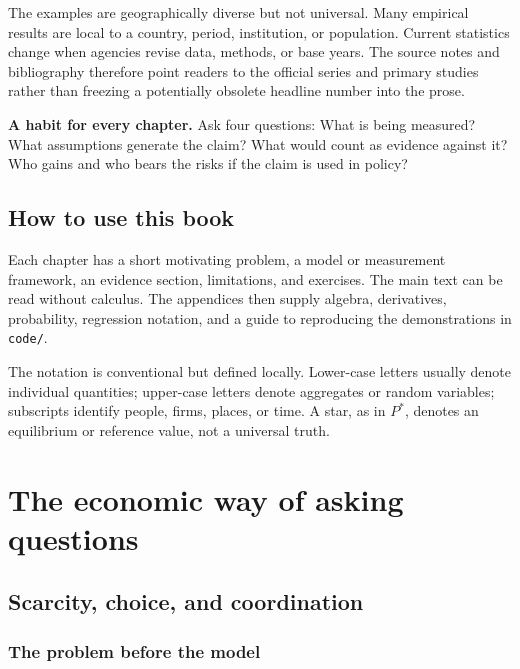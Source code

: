 \documentclass[11pt,oneside,openany]{book}
\begin{document}
The examples are geographically diverse but not universal. Many empirical results are local to a country, period, institution, or population. Current statistics change when agencies revise data, methods, or base years. The source notes and bibliography therefore point readers to the official series and primary studies rather than freezing a potentially obsolete headline number into the prose.

\begin{keybox}
\textbf{A habit for every chapter.} Ask four questions: What is being measured? What assumptions generate the claim? What would count as evidence against it? Who gains and who bears the risks if the claim is used in policy?
\end{keybox}

\chapter*{How to use this book}

Each chapter has a short motivating problem, a model or measurement framework, an evidence section, limitations, and exercises. The main text can be read without calculus. The appendices then supply algebra, derivatives, probability, regression notation, and a guide to reproducing the demonstrations in \texttt{code/}.

The notation is conventional but defined locally. Lower-case letters usually denote individual quantities; upper-case letters denote aggregates or random variables; subscripts identify people, firms, places, or time. A star, as in $P^*$, denotes an equilibrium or reference value, not a universal truth.

\tableofcontents

\mainmatter

\part{The economic way of asking questions}

\chapter{Scarcity, choice, and coordination}
\label{ch:scarcity}

\section{The problem before the model}
\end{document}
